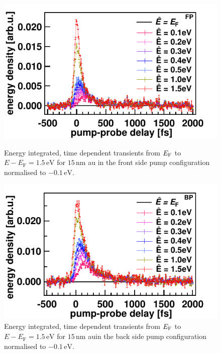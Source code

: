 \documentclass[a4paper,12pt,twoside]{article}
\begin{document}
	\begin{figure}[H]
		\begin{minipage}[t]{.44\linewidth}
			\includegraphics[width=\linewidth]{figures/15nmFPNorm.pdf}
			\caption{Energy integrated, time dependent transients from $E_{\rm{F}}$ to $E - E_\mathrm{F} = 1.5\,\mathrm{{eV}}$ for $15\,\mathrm{{nm}}$ \gls{au} in the front side pump configuration normalised to $-0.1\,\mathrm{{eV}}$.}
	    		\label{15nmFPNorm}
		\end{minipage}
	\hspace{.075\linewidth}
		\begin{minipage}[t]{.44\linewidth}
			\includegraphics[width=\linewidth]{figures/15nmBPNorm.pdf}
			\caption{Energy integrated, time dependent transients from $E_{\rm{F}}$ to $E - E_\mathrm{F} = 1.5\,\mathrm{{eV}}$ for $15\,\mathrm{{nm}}$ \gls{au}in the back side pump configuration normalised to $-0.1\,\mathrm{{eV}}$.}
	    		\label{15nmBPNorm}
		\end{minipage}
	\end{figure}
\end{document}
